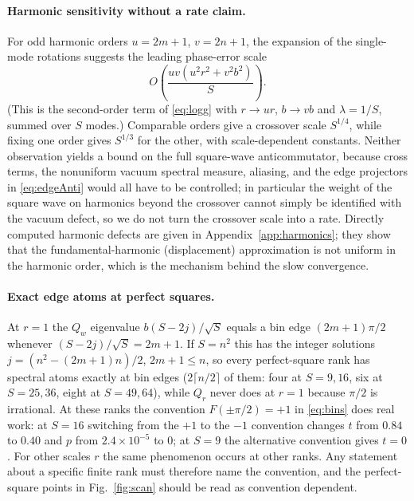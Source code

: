 \documentclass[11pt,a4paper]{article}
\begin{document}
\paragraph{Harmonic sensitivity without a rate claim.}
For odd harmonic orders $u=2m+1$, $v=2n+1$, the expansion of the single-mode rotations suggests the leading phase-error scale
\begin{equation}
O\!\left(\frac{uv(u^2r^2+v^2b^2)}{S}\right).
\label{eq:heur}
\end{equation}
(This is the second-order term of \eqref{eq:logg} with $r\to ur$, $b\to vb$ and $\lambda=1/S$, summed over $S$ modes.) Comparable orders give a crossover scale $S^{1/4}$, while fixing one order gives $S^{1/3}$ for the other, with scale-dependent constants. Neither observation yields a bound on the full square-wave anticommutator, because cross terms, the nonuniform vacuum spectral measure, aliasing, and the edge projectors in \eqref{eq:edgeAnti} would all have to be controlled; in particular the weight of the square wave on harmonics beyond the crossover cannot simply be identified with the vacuum defect, so we do not turn the crossover scale into a rate. Directly computed harmonic defects are given in Appendix~\ref{app:harmonics}; they show that the fundamental-harmonic (displacement) approximation is not uniform in the harmonic order, which is the mechanism behind the slow convergence.

\paragraph{Exact edge atoms at perfect squares.}
At $r=1$ the $Q_w$ eigenvalue $b(S-2j)/\sqrt S$ equals a bin edge $(2m+1)\pi/2$ whenever $(S-2j)/\sqrt S=2m+1$. If $S=n^2$ this has the integer solutions $j=(n^2-(2m+1)n)/2$, $2m+1\le n$, so every perfect-square rank has spectral atoms exactly at bin edges ($2\lceil n/2\rceil$ of them: four at $S=9,16$, six at $S=25,36$, eight at $S=49,64$), while $Q_r$ never does at $r=1$ because $\pi/2$ is irrational. At these ranks the convention $F(\pm\pi/2)=+1$ in \eqref{eq:bins} does real work: at $S=16$ switching from the $+1$ to the $-1$ convention changes $t$ from $0.84$ to $0.40$ and $p$ from $2.4\times10^{-5}$ to $0$; at $S=9$ the alternative convention gives $t=0$. For other scales $r$ the same phenomenon occurs at other ranks. Any statement about a specific finite rank must therefore name the convention, and the perfect-square points in Fig.~\ref{fig:scan} should be read as convention dependent.
\end{document}
